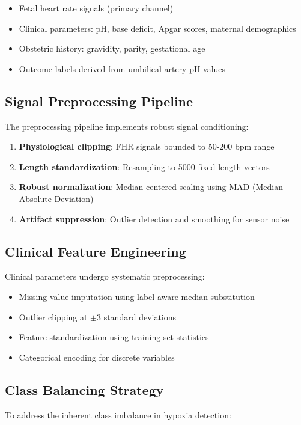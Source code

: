 \documentclass[12pt,a4paper]{article}
\begin{document}
\begin{itemize}
    \item Fetal heart rate signals (primary channel)
    \item Clinical parameters: pH, base deficit, Apgar scores, maternal demographics
    \item Obstetric history: gravidity, parity, gestational age
    \item Outcome labels derived from umbilical artery pH values
\end{itemize}

\subsection{Signal Preprocessing Pipeline}
The preprocessing pipeline implements robust signal conditioning:

\begin{enumerate}
    \item \textbf{Physiological clipping}: FHR signals bounded to 50-200 bpm range
    \item \textbf{Length standardization}: Resampling to 5000 fixed-length vectors
    \item \textbf{Robust normalization}: Median-centered scaling using MAD (Median Absolute Deviation)
    \item \textbf{Artifact suppression}: Outlier detection and smoothing for sensor noise
\end{enumerate}

\subsection{Clinical Feature Engineering}
Clinical parameters undergo systematic preprocessing:

\begin{itemize}
    \item Missing value imputation using label-aware median substitution
    \item Outlier clipping at $\pm$3 standard deviations
    \item Feature standardization using training set statistics
    \item Categorical encoding for discrete variables
\end{itemize}

\subsection{Class Balancing Strategy}
To address the inherent class imbalance in hypoxia detection:
\end{document}
